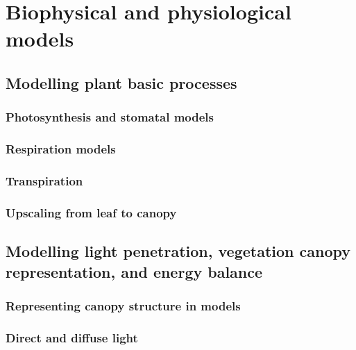 \documentclass[]{book}
\begin{document}
\part{Biophysical and physiological
models}\label{part-biophysical-and-physiological-models}

\chapter{Modelling plant basic
processes}\label{modelling-plant-basic-processes}


\section{Photosynthesis and stomatal
models}\label{photosynthesis-and-stomatal-models}

\section{Respiration models}\label{respiration-models}

\section{Transpiration}\label{transpiration}

\section{Upscaling from leaf to
canopy}\label{upscaling-from-leaf-to-canopy}

\chapter{Modelling light penetration, vegetation canopy representation,
and energy
balance}\label{modelling-light-penetration-vegetation-canopy-representation-and-energy-balance}


\section{Representing canopy structure in
models}\label{representing-canopy-structure-in-models}

\section{Direct and diffuse light}\label{direct-and-diffuse-light}
\end{document}
